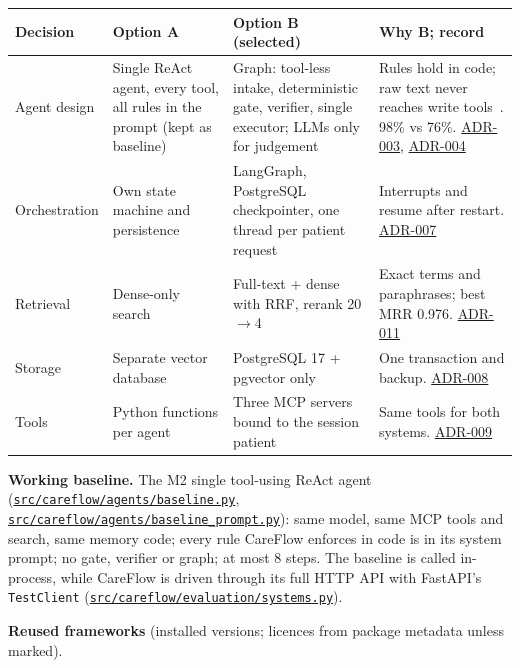\documentclass[10pt,a4paper]{article}
\newcommand{\repourl}{https://github.com/saideepaksana/careflow}
\newcommand{\rev}{cs5903-final-2026}
\newcommand{\file}[1]{\href{\repourl/blob/\rev/#1}{\nolinkurl{#1}}}
\newcommand{\adr}[1]{\href{\repourl/blob/\rev/docs/Architecture_Decision_Records.md}{ADR-#1}}
\begin{document}
\begin{table}[htbp]
\centering
\footnotesize
\begin{tabularx}{\textwidth}{P{1.9cm} P{3.6cm} L P{3.4cm}}
\toprule
\textbf{Decision} & \textbf{Option A} & \textbf{Option B (selected)} & \textbf{Why B; record} \\
\midrule
Agent design & Single ReAct agent, every tool, all rules in the prompt (kept as baseline) & Graph: tool-less intake, deterministic gate, verifier, single executor; LLMs only for judgement & Rules hold in code; raw text never reaches write tools~\cite{injection}. 98\% vs 76\%. \adr{003}, \adr{004} \\
Orchestration & Own state machine and persistence & LangGraph, PostgreSQL checkpointer, one thread per patient request & Interrupts and resume after restart. \adr{007} \\
Retrieval & Dense-only search & Full-text + dense with RRF, rerank 20$\rightarrow$4 & Exact terms and paraphrases; best MRR 0.976. \adr{011} \\
Storage & Separate vector database & PostgreSQL 17 + pgvector only & One transaction and backup. \adr{008} \\
Tools & Python functions per agent & Three MCP servers bound to the session patient & Same tools for both systems. \adr{009} \\
\bottomrule
\end{tabularx}
\end{table}

\textbf{Working baseline.} The M2 single tool-using ReAct agent (\file{src/careflow/agents/baseline.py}, \file{src/careflow/agents/baseline_prompt.py}): same model, same MCP tools and search, same memory code; every rule CareFlow enforces in code is in its system prompt; no gate, verifier or graph; at most 8 steps. The baseline is called in-process, while CareFlow is driven through its full HTTP API with FastAPI's \texttt{TestClient} (\file{src/careflow/evaluation/systems.py}).

\textbf{Reused frameworks} (installed versions; licences from package metadata unless marked).
\end{document}
